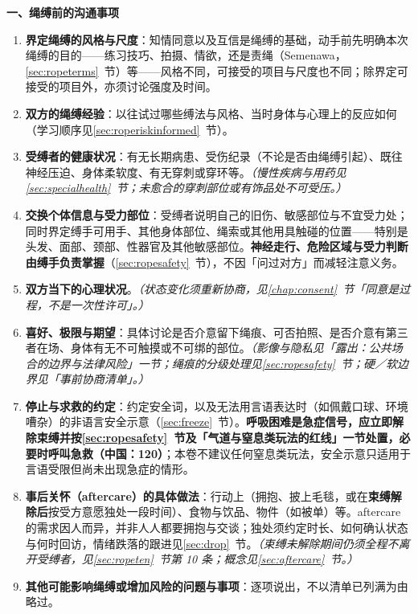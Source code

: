 \documentclass[12pt,UTF8]{ctexbook}
\begin{document}
\noindent\textbf{一、绳缚前的沟通事项}

\begin{enumerate}
\item \textbf{界定绳缚的风格与尺度}：知情同意以及互信是绳缚的基础，动手前先明确本次绳缚的目的——练习技巧、拍摄、情欲，还是责绳（Semenawa，\ref{sec:ropeterms}~节）等——风格不同，可接受的项目与尺度也不同；除界定可接受的项目外，亦须讨论强度及时间。
\item \textbf{双方的绳缚经验}：以往试过哪些缚法与风格、当时身体与心理上的反应如何（学习顺序见\ref{sec:roperiskinformed}~节）。
\item \textbf{受缚者的健康状况}：有无长期病患、受伤纪录（不论是否由绳缚引起）、既往神经压迫、身体柔软度、有无穿刺或穿环等。\textit{（慢性疾病与用药见\ref{sec:specialhealth}~节；未愈合的穿刺部位或有饰品处不可受压。）}
\item \textbf{交换个体信息与受力部位}：受缚者说明自己的旧伤、敏感部位与不宜受力处；同时界定缚手可用手、其他身体部位、绳索或其他用具触碰的位置——特别是头发、面部、颈部、性器官及其他敏感部位。\textbf{神经走行、危险区域与受力判断由缚手负责掌握}（\ref{sec:ropesafety}~节），不因「问过对方」而减轻注意义务。
\item \textbf{双方当下的心理状况}。\textit{（状态变化须重新协商，见\ref{chap:consent}~节「同意是过程，不是一次性许可」。）}
\item \textbf{喜好、极限与期望}：具体讨论是否介意留下绳痕、可否拍照、是否介意有第三者在场、身体有无不可触摸或不可绑的部位。\textit{（影像与隐私见「露出：公共场合的边界与法律风险」一节；绳痕的分级处理见\ref{sec:ropesafety}~节；硬／软边界见「事前协商清单」。）}
\item \textbf{停止与求救的约定}：约定安全词，以及无法用言语表达时（如佩戴口球、环境嘈杂）的非语言安全示意（\ref{sec:freeze}~节）。\textbf{呼吸困难是急症信号，应立即解除束缚并按\ref{sec:ropesafety}~节及「气道与窒息类玩法的红线」一节处置，必要时呼叫急救（中国：120）}；本卷不建议任何窒息类玩法，安全示意只适用于言语受限但尚未出现急症的情形。
\item \textbf{事后关怀（aftercare）的具体做法}：行动上（拥抱、披上毛毯，或在\textbf{束缚解除后}按受方意愿独处一段时间）、食物与饮品、物件（如被单）等。aftercare 的需求因人而异，并非人人都要拥抱与交谈；独处须约定时长、如何确认状态与何时回访，情绪跌落的跟进见\ref{sec:drop}~节。\textit{（束缚未解除期间仍须全程不离开受缚者，见\ref{sec:ropeten}~节第 10 条；概念见\ref{sec:aftercare}~节。）}
\item \textbf{其他可能影响绳缚或增加风险的问题与事项}：逐项说出，不以清单已列满为由略过。
\end{enumerate}
\end{document}
